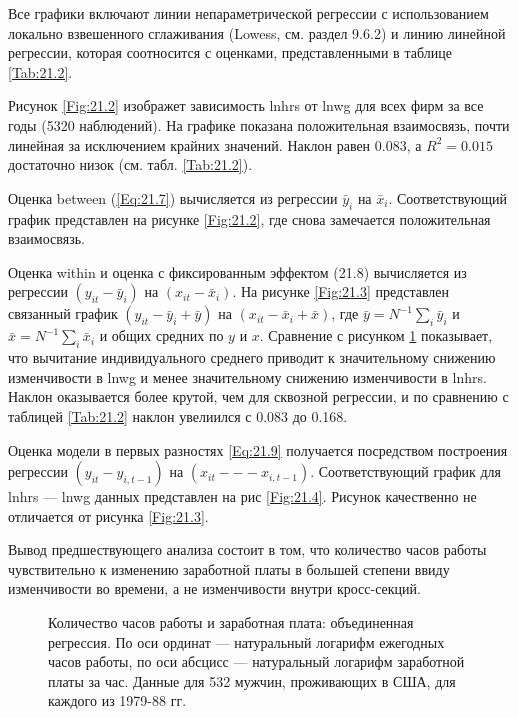 Все графики включают линии непараметрической регрессии с использованием локально взвешенного сглаживания (Lowess, см. раздел 9.6.2) и линию линейной регрессии, которая соотносится с оценками, представленными в таблице \ref{Tab:21.2}.

Рисунок \ref{Fig:21.2} изображет зависимость lnhrs от lnwg для всех фирм за все годы (5320 наблюдений). На графике показана положительная взаимосвязь, почти линейная за исключением крайних значений. Наклон равен 0.083, а $R^2=0.015$ достаточно низок (см. табл. \ref{Tab:21.2}).

Оценка between (\ref{Eq:21.7}) вычисляется из регрессии $\bar{y}_i$  на $\bar{x}_i$. Соответствующий график представлен на рисунке \ref{Fig:21.2}, где снова замечается положительная взаимосвязь. 

Оценка within и оценка с фиксированным эффектом (21.8) вычисляется из регрессии $(y_{it}-\bar{y}_i)$  на $(x_{it}-\bar{x}_i)$. На рисунке \ref{Fig:21.3} представлен связанный график $(y_{it}-\bar{y}_i+\bar{y})$  на $(x_{it}-\bar{x}_i+\bar{x})$, где $\bar{y}=N^{-1}\sum_{i} \bar{y}_i$ и $\bar{x}=N^{-1} \sum_{i} \bar{x}_i$ и общих средних по $y$ и $x$. Сравнение с рисунком \ref{Fig:21.1} показывает, что вычитание индивидуального среднего приводит к значительному снижению изменчивости в lnwg и менее значительному снижению изменчивости в lnhrs. Наклон оказывается более крутой, чем для сквозной регрессии, и по сравнению с таблицей \ref{Tab:21.2} наклон увелиился с 0.083 до 0.168.

Оценка модели в первых разностях \ref{Eq:21.9} получается посредством построения регрессии $(y_{it}-y_{i,t-1})$ на $(x_{it} --- x_{i,t-1})$. Соответствующий график для lnhrs --- lnwg данных представлен на рис \ref{Fig:21.4}. Рисунок качественно не отличается от рисунка \ref{Fig:21.3}.
 
Вывод предшествующего анализа состоит в том, что количество часов работы чувствительно к изменению заработной платы в большей степени ввиду изменчивости во времени, а не изменчивости внутри кросс-секций.

  \begin{figure}[ht]
                \begin{center}
                    \caption{Количество часов работы и заработная плата: объединенная регрессия. По оси ординат --- натуральный логарифм ежегодных часов работы, по оси абсцисс --- натуральный логарифм заработной платы за час. Данные для 532 мужчин, проживающих в США, для каждого из 1979-88 гг. }
                    \label{Fig:21.1}
                \end{center}
     \end{figure}


